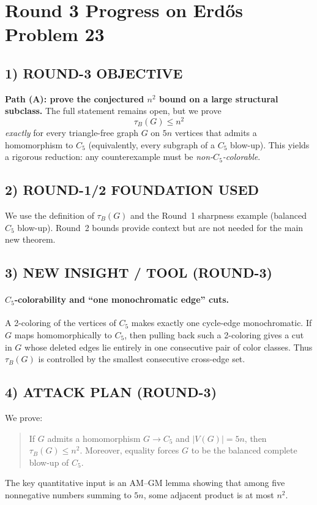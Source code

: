 \section{Round 3 Progress on Erd\H{o}s Problem 23}

\subsection*{1) ROUND-3 OBJECTIVE}
\textbf{Path (A): prove the conjectured $n^2$ bound on a large structural subclass.}
The full statement remains open, but we prove
\[
\tau_B(G)\le n^2
\]
\emph{exactly} for every triangle-free graph $G$ on $5n$ vertices that admits a
homomorphism to $C_5$ (equivalently, every subgraph of a $C_5$ blow-up).
This yields a rigorous reduction: any counterexample must be \emph{non-$C_5$-colorable}.

\subsection*{2) ROUND-1/2 FOUNDATION USED}
We use the definition of $\tau_B(G)$ and the Round~1 sharpness example (balanced $C_5$ blow-up).
Round~2 bounds provide context but are not needed for the main new theorem.

\subsection*{3) NEW INSIGHT / TOOL (ROUND-3)}
\paragraph{$C_5$-colorability and ``one monochromatic edge'' cuts.}
A 2-coloring of the vertices of $C_5$ makes exactly one cycle-edge monochromatic.
If $G$ maps homomorphically to $C_5$, then pulling back such a 2-coloring gives a cut in $G$
whose deleted edges lie entirely in one consecutive pair of color classes.
Thus $\tau_B(G)$ is controlled by the smallest consecutive cross-edge set.

\subsection*{4) ATTACK PLAN (ROUND-3)}
We prove:
\begin{quote}
If $G$ admits a homomorphism $G\to C_5$ and $|V(G)|=5n$, then $\tau_B(G)\le n^2$.
Moreover, equality forces $G$ to be the balanced complete blow-up of $C_5$.
\end{quote}
The key quantitative input is an AM--GM lemma showing that among five nonnegative numbers
summing to $5n$, some adjacent product is at most $n^2$.


